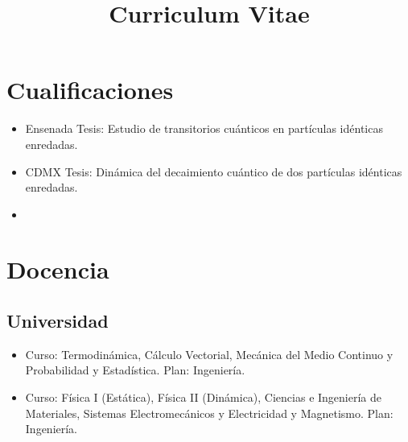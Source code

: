 \documentclass[11pt,a4paper,sans]{moderncv}      %
\title{\LARGE{Curriculum Vitae}}                               %
\begin{document}
\makecvtitle
\small{}

\section{Cualificaciones}


\vspace{5pt}

\begin{itemize}

\item{ {Ensenada} {} { Tesis: Estudio de transitorios cuánticos en partículas idénticas enredadas.}}

\item{ {CDMX} {} { Tesis: Din\'amica del decaimiento
cu\'antico de dos part\'iculas id\'enticas enredadas.}}

\item{
{ }}  %


\end{itemize}

\section{Docencia}

\subsection{Universidad}

\vspace{6pt}

\begin{itemize}

\item{
{}{Curso: Termodin\'amica, Cálculo Vectorial, Mecánica del Medio Continuo y Probabilidad y Estadística. Plan: Ingeniería.}{}}
\vspace{3pt}


\item{ {}{Curso:
F\'isica I (Est\'atica), Física II (Dinámica), Ciencias e Ingeniería de Materiales, Sistemas Electromecánicos y Electricidad y Magnetismo. Plan: Ingeniería.}{}}\vspace{3pt}

\end{itemize}
\end{document}
